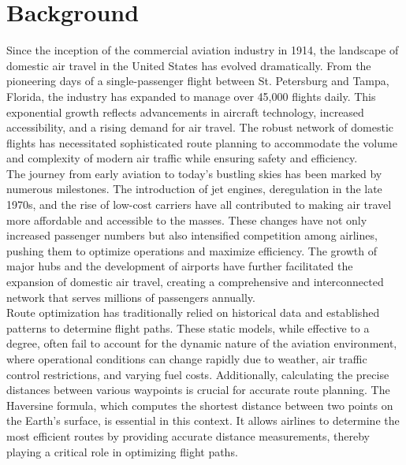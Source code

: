 \documentclass{article}
\begin{document}
\section{Background}

Since the inception of the commercial aviation industry in 1914, the landscape of domestic air travel in the United States has evolved dramatically. From the pioneering days of a single-passenger flight between St. Petersburg and Tampa, Florida, the industry has expanded to manage over 45,000 flights daily. This exponential growth reflects advancements in aircraft technology, increased accessibility, and a rising demand for air travel. The robust network of domestic flights has necessitated sophisticated route planning to accommodate the volume and complexity of modern air traffic while ensuring safety and efficiency.\\

The journey from early aviation to today's bustling skies has been marked by numerous milestones. The introduction of jet engines, deregulation in the late 1970s, and the rise of low-cost carriers have all contributed to making air travel more affordable and accessible to the masses. These changes have not only increased passenger numbers but also intensified competition among airlines, pushing them to optimize operations and maximize efficiency. The growth of major hubs and the development of airports have further facilitated the expansion of domestic air travel, creating a comprehensive and interconnected network that serves millions of passengers annually.\\

Route optimization has traditionally relied on historical data and established patterns to determine flight paths. These static models, while effective to a degree, often fail to account for the dynamic nature of the aviation environment, where operational conditions can change rapidly due to weather, air traffic control restrictions, and varying fuel costs. Additionally, calculating the precise distances between various waypoints is crucial for accurate route planning. The Haversine formula, which computes the shortest distance between two points on the Earth's surface, is essential in this context. It allows airlines to determine the most efficient routes by providing accurate distance measurements, thereby playing a critical role in optimizing flight paths.\\
\end{document}
